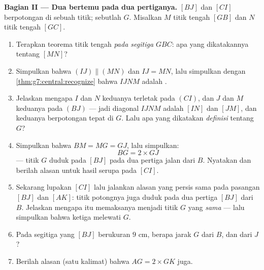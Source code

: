 \begin{problem}
\medskip
\noindent\textbf{Bagian II --- Dua  bertemu pada dua
pertiganya.}
 $[BJ]$ dan $[CI]$ berpotongan di sebuah titik; sebutlah
$G$. Misalkan $M$ titik tengah $[GB]$ dan $N$ titik tengah $[GC]$.
\begin{enumerate}[resume]
  \item Terapkan teorema titik tengah \emph{pada segitiga $GBC$}:
        apa yang dikatakannya tentang  $[MN]$?
  \item Simpulkan bahwa $(IJ) \parallel (MN)$ dan $IJ = MN$, lalu
        simpulkan dengan \cref{thm:g7:central:recognize} bahwa $IJNM$
        adalah .
  \item Jelaskan mengapa $I$ dan $N$ keduanya terletak pada  $(CI)$, dan $J$ dan $M$ keduanya pada 
        $(BJ)$ --- jadi diagonal  $IJNM$ adalah $[IN]$
        dan $[JM]$, dan keduanya berpotongan tepat di $G$. Lalu apa
        yang dikatakan \emph{definisi}  tentang $G$?
  \item Simpulkan bahwa $BM = MG = GJ$, lalu simpulkan:
        \[
        BG = 2 \times GJ
        \]
        --- titik $G$ duduk pada  $[BJ]$ pada dua
        pertiga jalan dari  $B$. Nyatakan dan berilah
        alasan untuk hasil serupa pada  $[CI]$.
  \item Sekarang lupakan $[CI]$ lalu jalankan alasan yang persis sama
        pada pasangan  $[BJ]$ dan $[AK]$: titik potongnya
        juga duduk pada dua pertiga $[BJ]$ dari $B$. Jelaskan mengapa
        itu memaksanya menjadi titik $G$ yang \emph{sama} --- lalu
        simpulkan bahwa ketiga  melewati $G$.
  \item Pada segitiga yang  $[BJ]$ berukuran $9$ cm,
        berapa jarak $G$ dari $B$, dan dari $J$?
  \item Berilah alasan (satu kalimat) bahwa $AG = 2 \times GK$ juga.
\end{enumerate}


\end{problem}
